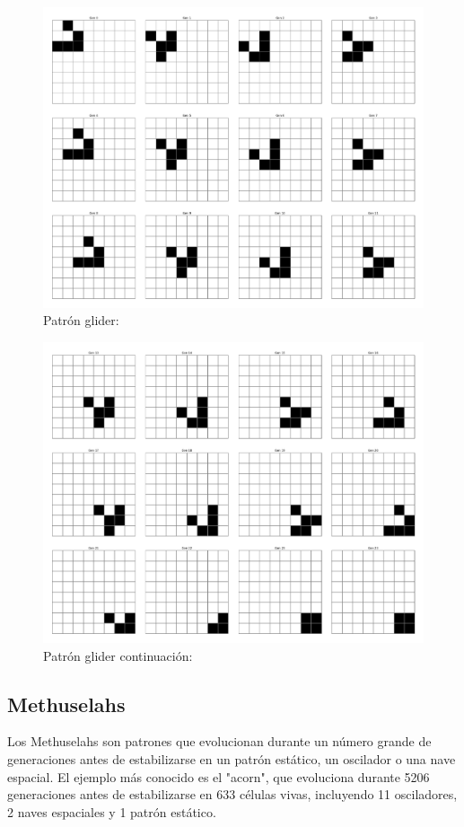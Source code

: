 \documentclass[]{article}
\begin{document}
\begin{figure}[H]
  \centering
  \includegraphics[width=1\textwidth]{../assets/space_ships/glider/glider_12.jpg}
  \caption{Patrón glider: }
  \label{fig:glider}
  \end{figure}
  \begin{figure}[H]
    \centering
    \includegraphics[width=1\textwidth]{../assets/space_ships/glider/glider_12_24.jpg}
    \caption{Patrón glider continuación: }
    \label{fig:glider_12_24}
    \end{figure}

\subsection{Methuselahs}
Los Methuselahs son patrones que evolucionan durante un número grande de generaciones antes de estabilizarse en un patrón estático, un oscilador o una nave espacial. El ejemplo más conocido es el "acorn", que evoluciona durante 5206 generaciones antes de estabilizarse en 633 células vivas, incluyendo 11 osciladores, 2 naves espaciales y 1 patrón estático.
\end{document}
